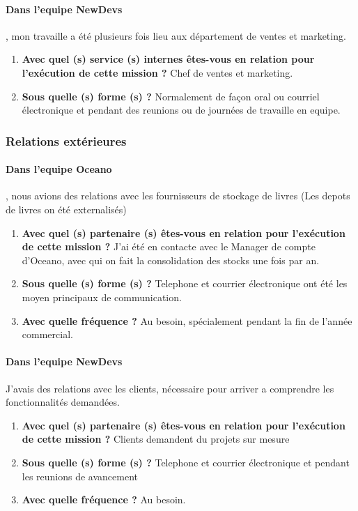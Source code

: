\documentclass{resume} %
\begin{document}
		\paragraph{Dans l'equipe NewDevs}, mon travaille a été plusieurs fois lieu aux département de ventes et marketing. 

		 \begin{enumerate} 
		\item \textbf{ Avec quel (s) service (s) internes êtes-vous en relation pour l'exécution de cette mission ?}
			Chef de ventes et marketing. 
		\item \textbf{Sous quelle (s) forme (s) ?}
			Normalement de façon oral ou courriel électronique et pendant des reunions ou de journées de travaille en equipe. 
		\end {enumerate}

	
	\subsubsection{Relations extérieures} 
		\paragraph{Dans l'equipe Oceano}, nous avions des relations avec les fournisseurs de stockage de livres (Les depots de livres on été externalisés)
		 \begin{enumerate} 
		\item \textbf{Avec quel (s) partenaire (s) êtes-vous en relation pour l'exécution de cette mission ?}
			J'ai été en contacte avec le Manager de compte d'Oceano, avec qui on fait la consolidation des stocks une fois par an.
		\item \textbf{ Sous quelle (s) forme (s) ?}
			Telephone et courrier électronique ont été les moyen principaux de communication. 
		\item \textbf{ Avec quelle fréquence ?}
			Au besoin, spécialement pendant la fin de l'année commercial.
		\end {enumerate}			

		\paragraph{Dans l'equipe NewDevs} J'avais des relations avec les clients, nécessaire pour arriver a comprendre les fonctionnalités demandées.   
		 \begin{enumerate} 
		\item \textbf{Avec quel (s) partenaire (s) êtes-vous en relation pour l'exécution de cette mission ?}
			Clients demandent du projets sur mesure 
		\item \textbf{ Sous quelle (s) forme (s) ?}
			Telephone et courrier électronique et pendant les reunions de avancement 
		\item \textbf{ Avec quelle fréquence ?}
			Au besoin.
		\end {enumerate}			
\end{document}
